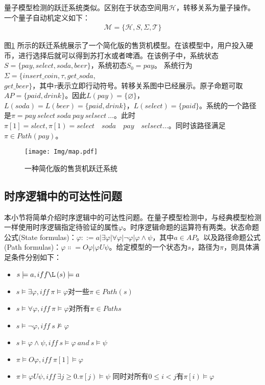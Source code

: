 量子模型检测的跃迁系统类似。区别在于状态空间用\(\mathcal{H}\)，转移关系为量子操作。一个量子自动机定义如下：
\begin{align}
    \mathcal{M}=\{\mathcal{H},S,\Sigma,\mathcal{T}\}
\end{align}
\begin{example}
    
    图\ref{fig:transition-system} 所示的跃迁系统展示了一个简化版的售货机模型。在该模型中，用户投入硬币，进行选择后就可以得到苏打水或者啤酒。在该例子中，系统状态\(S=\{pay,select,soda,beer\}\)，系统初态\(S_0=pay\)。
    系统行为\(\Sigma=\{insert\_coin,\tau,get\_soda\),\\\(get\_beer\}\)，其中\(\tau\)表示立即行动符号。转移关系图中已经展示。原子命题可取\(AP=\{paid,drink\}\)。因此\(L\left( pay \right)=\{\varnothing\}\)，\(L\left(soda\right)=L\left(beer\right)=\{paid,drink\}\)，\(L\left(select\right)=\{paid\}\)。系统的一个路径是\(\pi=pay\ select\ soda\ pay\ selsect\ \ldots\)。此时\(\pi\left[1\right]=slect,\pi\left[1\right)=select\quad soda\quad pay\quad selsect\ldots\)。同时该路径满足\(\pi\in Path\left(pay\right)\)。
    \begin{figure}[!htbp]
        \centering
        \texttt{[image: Img/map.pdf]}
        \caption{一种简化版的售货机跃迁系统}
        \label{fig:transition-system}
    \end{figure}
\end{example}

\subsection{时序逻辑中的可达性问题}
本小节将简单介绍时序逻辑中的可达性问题。在量子模型检测中，与经典模型检测一样使用时序逻辑指定待验证的属性\(\varphi\)。时序逻辑命题的运算符有两类\citep{goranko_2023}。状态命题公式(State formulas)：\(\varphi ::=a\left|\exists\varphi\right|\forall \varphi\left|\lnot\varphi\right|\varphi\land\psi\)，其中\(a\in AP\)。以及路径命题公式(Path formulas)：\(\varphi\Colon=O\varphi|\varphi U\psi\)。给定模型的一个状态为\(s\)，路径为\(\pi\)，则具体满足条件分别如下：
\begin{itemize}
    \item \(s\models a,iff \L\left(s\right)\models a\)
    \item \(s\models\exists\varphi,iff\ \pi\models\varphi\)对一些\(\pi\in Path\left(s\right)\)
    \item \(s\models\forall\varphi,iff\ \pi\models\varphi\)对所有\(π\in Paths\)
    \item \(s\models\lnot\varphi,iff\ s\nvDash\varphi\)
    \item \(s\models\varphi\land\psi,iff\ s\models\varphi\ and\ s\models\psi\)
    \item \(\pi\models O\varphi,iff\ \pi\left[1\right]\models\varphi\)
    \item \(\pi\models\varphi U\psi,iff\ \exists j\geq0\).\(\pi\left[j\right)\models\psi\) 同时对所有\(0\le i<j\)有\(\pi\left[i\right)\models\varphi\)
\end{itemize}


